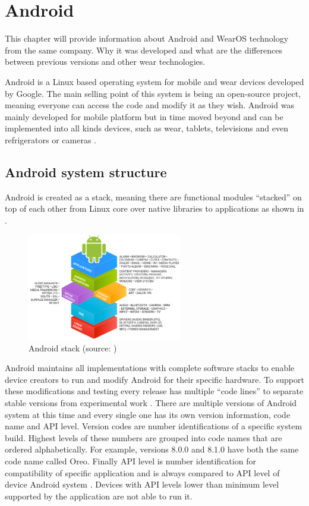 \chapter{Android}\label{sec:Android}
This chapter will provide information about Android and WearOS technology from the same company. Why it was developed and what are the differences between previous versions and other wear technologies.

Android is a Linux based operating system for mobile and wear devices developed by Google. The main selling point of this system is being an open-source project, meaning everyone can access the code and modify it as they wish. Android was mainly developed for mobile platform but in time moved beyond and can be implemented into all kinds devices, such as wear, tablets, televisions and even refrigerators or cameras \cite{WIGA}.

\section{Android system structure}\label{sec:AndroidSystemStructure}
Android is created as a stack, meaning there are functional modules \enquote{stacked} on top of each other from Linux core over native libraries to applications as shown in .

\begin{figure}[H]
	\begin{centering}
		\includegraphics[width=0.6\textwidth]{img/android_stack}
		\par\end{centering}
	\caption{Android stack (source: \cite{AOSP})\label{fig:AndroidStack}}
	\label{fig01c04}
\end{figure}

Android maintains all implementations with complete software stacks to enable device creators to run and modify Android for their specific hardware. To support these modifications and testing every release has multiple \enquote{code lines} to separate stable versions from experimental work \cite{AOSP}. There are multiple versions of Android system at this time and every single one has its own version information, code name and API level. Version codes are number identifications of a specific system build. Highest levels of these numbers are grouped into code names that are ordered alphabetically. For example, versions 8.0.0 and 8.1.0 have both the same code name called Oreo. Finally API level is number identification for compatibility of specific application and is always compared to API level of device Android system \cite{AOSP, AD}. Devices with API levels lower than minimum level supported by the application are not able to run it.

